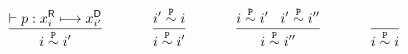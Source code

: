 \documentclass{article}
\begin{document}
\pagestyle{empty}
\noindent
\begin{minipage}{12.3cm}%
\medskip
      $$
      \infrulenl{  \vdash p : \ri{x}{i} \resolveau{} \di{x}{i'}}{ i \seq{\text{\tt P}} i'} \tab\tab\tab\tab
      \infrulenl{ i' \seq{\text{\tt P}} i}{ i \seq{\text{\tt P}} i'}\tab\tab\tab\tab  
      \infrulenl{ i \seq{\text{\tt P}} i' \tab i' \seq{\text{\tt P}} i''}{ i \seq{\text{\tt P}} i''} \tab\tab\tab\tab 
      \infrulenl{}{i \seq{\text{\tt P}} i}\bigskip
      $$
\end{minipage}%
\end{document}
